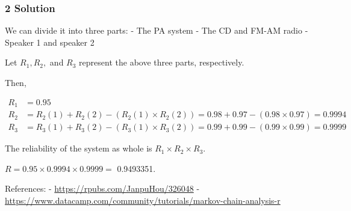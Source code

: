 \documentclass[]{article}
\begin{document}
\hypertarget{solution-1}{%
\subsubsection{2 Solution}\label{solution-1}}

We can divide it into three parts: - The PA system - The CD and FM-AM
radio - Speaker 1 and speaker 2

Let \(R_1, R_2,\) and \(R_3\) represent the above three parts,
respectively.

Then,

\begin{align*}
R_1 &= 0.95 \\
R_2 &= R_2(1) + R_2(2) - (R_2(1)\times R_2(2)) = 0.98 + 0.97 - (0.98\times 0.97) = 0.9994 \\
R_3 &= R_3(1) + R_3(2) - (R_3(1)\times R_3(2)) = 0.99 + 0.99 - (0.99\times 0.99) = 0.9999
\end{align*}

The reliability of the system as whole is \(R_1 \times R_2 \times R_3\).

\(R = 0.95 \times 0.9994 \times 0.9999 =\) 0.9493351.

References: - \url{https://rpubs.com/JanpuHou/326048} -
\url{https://www.datacamp.com/community/tutorials/markov-chain-analysis-r}
\end{document}
